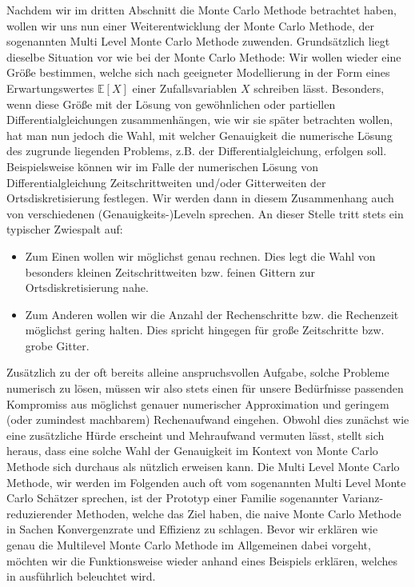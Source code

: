
Nachdem wir im dritten Abschnitt die Monte Carlo Methode betrachtet haben, wollen wir uns nun einer Weiterentwicklung der Monte Carlo Methode, der sogenannten Multi Level Monte Carlo Methode zuwenden. Grundsätzlich liegt dieselbe Situation vor wie bei der Monte Carlo Methode:
Wir wollen wieder eine Größe bestimmen, welche sich nach geeigneter Modellierung in der Form eines Erwartungswertes $ \mathbb{E}[X] $ einer Zufallsvariablen $ X $ schreiben lässt. Besonders, wenn diese Größe mit der Lösung von gewöhnlichen oder partiellen Differentialgleichungen zusammenhängen, wie wir sie später betrachten wollen, hat man nun jedoch die Wahl, mit welcher Genauigkeit die numerische Lösung des zugrunde liegenden Problems, z.B. der Differentialgleichung, erfolgen soll. Beispielsweise können wir im Falle der numerischen Lösung von Differentialgleichung Zeitschrittweiten und/oder Gitterweiten der Ortsdiskretisierung festlegen. Wir werden dann in diesem Zusammenhang auch von verschiedenen (Genauigkeits-)Leveln sprechen. An dieser Stelle tritt stets ein typischer Zwiespalt auf:
\begin{itemize}
	\item Zum Einen wollen wir möglichst genau rechnen. Dies legt die Wahl von besonders kleinen Zeitschrittweiten bzw. feinen Gittern zur Ortsdiskretisierung nahe.
	\item Zum Anderen wollen wir die Anzahl der Rechenschritte bzw. die Rechenzeit möglichst gering halten. Dies spricht hingegen für große Zeitschritte bzw. grobe Gitter.
\end{itemize}
Zusätzlich zu der oft bereits alleine anspruchsvollen Aufgabe, solche Probleme numerisch zu lösen, müssen wir also stets einen für unsere Bedürfnisse passenden Kompromiss aus möglichst genauer numerischer Approximation und geringem (oder zumindest machbarem) Rechenaufwand eingehen. Obwohl dies zunächst wie eine zusätzliche Hürde erscheint und Mehraufwand vermuten lässt, stellt sich heraus, dass eine solche Wahl der Genauigkeit im Kontext von Monte Carlo Methode sich durchaus als nützlich erweisen kann. 
Die Multi Level Monte Carlo Methode, wir werden im Folgenden auch oft vom sogenannten Multi Level Monte Carlo Schätzer sprechen, ist der Prototyp einer Familie sogenannter Varianz-reduzierender Methoden, welche das Ziel haben, die naive Monte Carlo Methode in Sachen Konvergenzrate und Effizienz zu schlagen. Bevor wir erklären wie genau die Multilevel Monte Carlo Methode im Allgemeinen dabei vorgeht, möchten wir die Funktionsweise wieder anhand eines Beispiels erklären, welches in \cite{heinrich2001multilevel} ausführlich beleuchtet wird.

